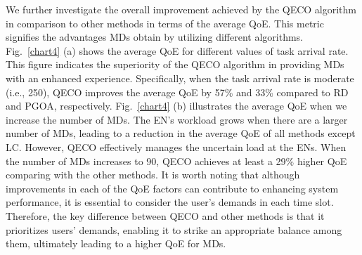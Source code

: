 \documentclass[12pt,draftclsnofoot,onecolumn]{IEEEtran}
\begin{document}


We further investigate the overall improvement achieved by the QECO algorithm in comparison to other methods in terms of the average QoE. This metric signifies the advantages MDs obtain by utilizing different algorithms. Fig.~\ref{chart4} (a) shows the average QoE for different values of task arrival rate. This figure indicates the superiority of the QECO algorithm in providing MDs with an enhanced experience. Specifically, when the task arrival rate is moderate (i.e., 250), QECO improves the average QoE by 57\% and 33\% compared to RD and PGOA, respectively. Fig.~\ref{chart4} (b) illustrates the average QoE when we increase the number of MDs. The EN's workload grows when there are a larger number of MDs, leading to a reduction in the average QoE of all methods except LC. However, QECO effectively manages the uncertain load at the ENs. When the number of MDs increases to 90, QECO achieves at least a 29\% higher QoE comparing with the other methods.
It is worth noting that although improvements in each of the QoE factors can contribute to enhancing system performance, it is essential to consider the user's demands in each time slot. Therefore, the key difference between QECO and other methods is that it prioritizes users' demands, enabling it to strike an appropriate balance among them, ultimately leading to a higher QoE for MDs.
\end{document}
